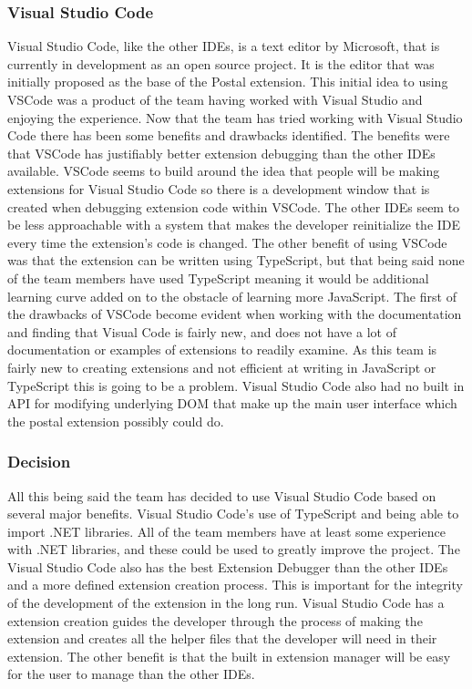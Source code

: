 \documentclass[letterpaper,10pt,titlepage,draftclsnofoot,onecolumn,onesided] {IEEEtran}
\begin{document}
\subsubsection{Visual Studio Code}
Visual Studio Code, like the other IDEs, is a text editor by Microsoft, that is currently in development as an open source project. \cite{VSCode}
It is the editor that was initially proposed as the base of the Postal extension. 
This initial idea to using VSCode was a product of the team having worked with Visual Studio and enjoying the experience. 
Now that the team has tried working with Visual Studio Code there has been some benefits and drawbacks identified. 
The benefits were that VSCode has justifiably better extension debugging than the other IDEs available. 
VSCode seems to build around the idea that people will be making extensions for Visual Studio Code so there is a development window that is created when debugging extension code within VSCode. 
The other IDEs seem to be less approachable with a system that makes the developer reinitialize the IDE every time the extension's code is changed. 
The other benefit of using VSCode was that the extension can be written using TypeScript, but that being said none of the team members have used TypeScript meaning it would be additional learning curve added on to the obstacle of learning more JavaScript. 
The first of the drawbacks of VSCode become evident when working with the documentation and finding that Visual Code is fairly new, and does not have a lot of documentation or examples of extensions to readily examine. 
As this team is fairly new to creating extensions and not efficient at writing in JavaScript or TypeScript this is going to be a problem. 
Visual Studio Code also had no built in API for modifying underlying DOM that make up the main user interface which the postal extension possibly could do.

\subsubsection{Decision}
All this being said the team has decided to use Visual Studio Code based on several major benefits. 
Visual Studio Code's use of TypeScript and being able to import .NET libraries. 
All of the team members have at least some experience with .NET libraries, and these could be used to greatly improve the project. 
The Visual Studio Code also has the best Extension Debugger than the other IDEs and a more defined extension creation process.
This is important for the integrity of the development of the extension in the long run. 
Visual Studio Code has a extension creation guides the developer through the process of making the extension and creates all the helper files that the developer will need in their extension.
The other benefit is that the built in extension manager will be easy for the user to manage than the other IDEs. 
\end{document}

